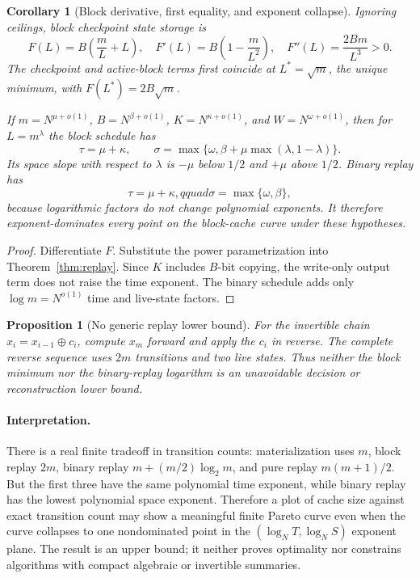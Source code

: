 \documentclass[11pt]{article}
\newtheorem{corollary}[theorem]{Corollary}
\newtheorem{proposition}[theorem]{Proposition}
\begin{document}
\begin{corollary}[Block derivative, first equality, and exponent collapse]
\label{cor:collapse}
Ignoring ceilings, block checkpoint state storage is
\[
F(L)=B\left(\frac mL+L\right),\quad
F'(L)=B\left(1-\frac m{L^2}\right),\quad
F''(L)=\frac{2Bm}{L^3}>0.
\]
The checkpoint and active-block terms first coincide at $L^*=\sqrt m$, the unique minimum, with
$F(L^*)=2B\sqrt m$.

If $m=N^{\mu+o(1)}$, $B=N^{\beta+o(1)}$, $K=N^{\kappa+o(1)}$, and
$W=N^{\omega+o(1)}$, then for $L=m^\lambda$ the block schedule has
\[
\tau=\mu+\kappa,\qquad
\sigma=\max\{\omega,\beta+\mu\max(\lambda,1-\lambda)\}.
\]
Its space slope with respect to $\lambda$ is $-\mu$ below $1/2$ and $+\mu$ above $1/2$.  Binary
replay has
\[
\boxed{\tau=\mu+\kappa,qquad\sigma=\max\{\omega,\beta\}},
\]
because logarithmic factors do not change polynomial exponents.  It therefore exponent-dominates
every point on the block-cache curve under these hypotheses.
\end{corollary}

\begin{proof}
Differentiate $F$.  Substitute the power parametrization into
Theorem~\ref{thm:replay}.  Since $K$ includes $B$-bit copying, the write-only output term does not
raise the time exponent.  The binary schedule adds only $\log m=N^{o(1)}$ time and live-state factors.
\end{proof}

\begin{proposition}[No generic replay lower bound]
For the invertible chain $x_i=x_{i-1}\oplus c_i$, compute $x_m$ forward and apply the $c_i$ in reverse.
The complete reverse sequence uses $2m$ transitions and two live states.  Thus neither the block
minimum nor the binary-replay logarithm is an unavoidable decision or reconstruction lower bound.
\end{proposition}

\paragraph{Interpretation.}
There is a real finite tradeoff in transition counts: materialization uses $m$, block replay $2m$,
binary replay $m+(m/2)\log_2m$, and pure replay $m(m+1)/2$.  But the first three have the same
polynomial time exponent, while binary replay has the lowest polynomial space exponent.  Therefore a
plot of cache size against exact transition count may show a meaningful finite Pareto curve even when
the curve collapses to one nondominated point in the $(\log_NT,\log_NS)$ exponent plane.  The result
is an upper bound; it neither proves optimality nor constrains algorithms with compact algebraic or
invertible summaries.
\end{document}

